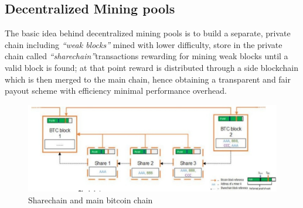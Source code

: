 \subsection{Decentralized Mining pools}
\begin{paracol}{2}
   
   The basic idea behind decentralized mining pools is to build a separate, private chain including \textit{``weak blocks''} mined with lower difficulty, store in the private chain called \textit{``sharechain''}transactions rewarding for mining weak blocks
   until a valid block is found;
   at that point reward is distributed through a side blockchain which is then merged to the main chain, hence obtaining a transparent and fair payout scheme with efficiency minimal performance overhead.

   \switchcolumn

   \begin{figure}[htbp]
      \centering
      \includegraphics{images/bitcoin_decentralized_pool.png}
      \caption{Sharechain and main bitcoin chain}
      \label{fig:bitcoin_decentralized_pool}
   \end{figure}

\end{paracol}